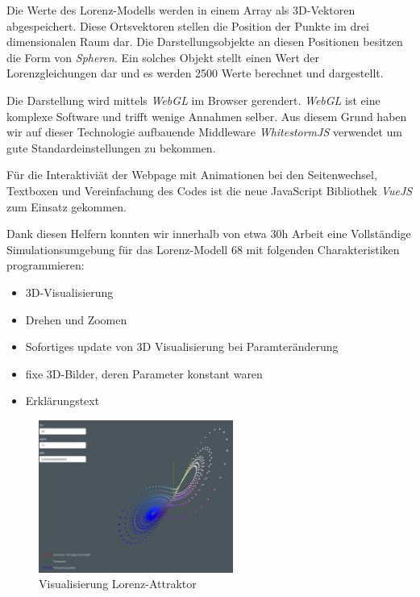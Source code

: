 Die Werte des Lorenz-Modells werden in einem Array als 3D-Vektoren abgespeichert. Diese Ortsvektoren stellen die Position der Punkte im drei dimensionalen Raum dar. Die Darstellungsobjekte an diesen Positionen besitzen die Form von \textit{Spheren}. Ein solches Objekt stellt einen Wert der Lorenzgleichungen dar und es werden 2500 Werte berechnet und dargestellt.

Die Darstellung wird mittels \textit{WebGL}\cite{WebGL} im Browser gerendert. \textit{WebGL} ist eine komplexe Software und trifft wenige Annahmen selber. Aus diesem Grund haben wir auf dieser Technologie aufbauende Middleware \textit{WhitestormJS}\cite{whitestormJS} verwendet um gute Standardeinstellungen zu bekommen.

Für die Interaktiviät der Webpage mit Animationen bei den Seitenwechsel, Textboxen und Vereinfachung des Codes ist die neue JavaScript Bibliothek \textit{VueJS}\cite{VueJS} zum Einsatz gekommen.

Dank diesen Helfern konnten wir innerhalb von etwa 30h Arbeit eine Vollständige Simulationsumgebung für das Lorenz-Modell 68 mit folgenden Charakteristiken programmieren:

\begin{itemize}
	\item 3D-Visualisierung
	\item Drehen und Zoomen
	\item Sofortiges update von 3D Visualisierung bei Paramteränderung
	\item fixe 3D-Bilder, deren Parameter konstant waren
	\item Erklärungstext
\end{itemize}

\begin{figure}
	\centering	\includegraphics[height=5cm]{lorenz/assets/implementation/Visualisierung}
	\caption{Visualisierung Lorenz-Attraktor}
	\label{fig:visualisierung}
\end{figure}
